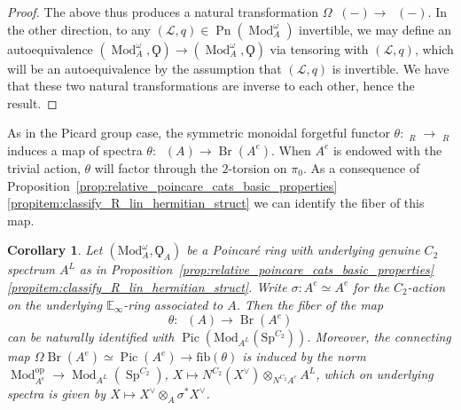 \documentclass{article}
\DeclareMathOperator{\Br}{Br} %
\DeclareMathOperator{\Brp}{Br^p} %
\DeclareMathOperator{\Cat}{\mathcal{C}at} %
\DeclareMathOperator{\Catex}{\Cat_\infty^{ex}} %
\DeclareMathOperator{\Catp}{Cat^p_\infty} %
\DeclareMathOperator{\Mod}{Mod} %
\DeclareMathOperator{\Pic}{Pic} %
\DeclareMathOperator{\Picp}{Pic^p} %
\DeclareMathOperator{\Pn}{Pn} %
\DeclareMathOperator{\Spectra}{Sp} %
\newcommand{\EE}{\mathbb{E}}
\newcommand{\op}{\mathrm{op}} %
\newtheorem{corollary}[equation]{Corollary}
\theoremstyle{definition}
\begin{document}
\begin{proof}
    The above thus produces a natural transformation $\Omega \Brp(-)\to \Picp(-)$. In the other direction, to any $(\mathcal{L},q)\in \Pn(\Mod_{A}^\omega)$ invertible, we may define an autoequivalence $(\Mod_A^\omega,\Qoppa)\to (\Mod_A^\omega,\Qoppa)$ via tensoring with $(\mathcal{L},q)$, which will be an autoequivalence by the assumption that $(\mathcal{L},q)$ is invertible. We have that these two natural transformations are inverse to each other, hence the result.
\end{proof}

As in the Picard group case, the symmetric monoidal forgetful functor $\theta \colon \Catp_{R} \to \Catex_R $ induces a map of spectra $ \theta \colon \Brp(A)\to \Br(A^e)$. 
When $ A^e $ is endowed with the trivial action, $ \theta $ will factor through the $2$-torsion on $\pi_0$. 
As a consequence of Proposition~\ref{prop:relative_poincare_cats_basic_properties}\ref{propitem:classify_R_lin_hermitian_struct} we can identify the fiber of this map.
\begin{corollary}\label{cor:Poincare_Brauer_to_Brauer_fiber}
Let $(\mathrm{Mod}_A^\omega, \Qoppa_A)$ be a Poincar{\'e} ring with underlying genuine $C_2$ spectrum $A^L$ as in Proposition~\ref{prop:relative_poincare_cats_basic_properties}\ref{propitem:classify_R_lin_hermitian_struct}. 
Write $ \sigma \colon A^e \simeq A^e $ for the $ C_2 $-action on the underlying $ \EE_\infty $-ring associated to $ A $. 
Then the fiber of the map \[\theta \colon \Brp(A)\to \Br(A^e)\] can be naturally identified with $ \Pic \left(\mathrm{Mod}_{A^L}\left(\mathrm{Sp}^{C_2}\right) \right)  $. 
Moreover, the connecting map $ \Omega \Br(A^e) \simeq \Pic(A^e) \to \mathrm{fib}(\theta) $ is induced by the norm $ \Mod_{A^e}^\op \to \Mod_{A^L}\left(\Spectra^{C_2}\right) $, $ X \mapsto N^{C_2} (X^\vee) \otimes_{N^{C_2}A^e} A^L $, which on underlying spectra is given by $ X \mapsto X^\vee \otimes_A \sigma^* X^\vee $. 
\end{corollary}
\end{document}
